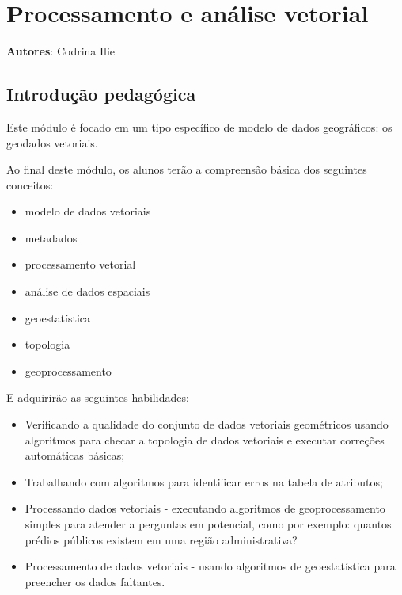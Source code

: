 \documentclass[
]{book}
\providecommand{\tightlist}{%
  \setlength{\itemsep}{0pt}\setlength{\parskip}{0pt}}
\begin{document}
\hypertarget{processamento-e-anuxe1lise-vetorial}{%
\chapter{\texorpdfstring{\textbf{Processamento e análise vetorial}}{Processamento e análise vetorial}}\label{processamento-e-anuxe1lise-vetorial}}

\textbf{Autores}: Codrina Ilie

\hypertarget{introduuxe7uxe3o-pedaguxf3gica-8}{%
\section{Introdução pedagógica}\label{introduuxe7uxe3o-pedaguxf3gica-8}}

Este módulo é focado em um tipo específico de modelo de dados geográficos: os geodados vetoriais.

Ao final deste módulo, os alunos terão a compreensão básica dos seguintes conceitos:

\begin{itemize}
\tightlist
\item
  modelo de dados vetoriais
\item
  metadados
\item
  processamento vetorial
\item
  análise de dados espaciais
\item
  geoestatística
\item
  topologia
\item
  geoprocessamento
\end{itemize}

E adquirirão as seguintes habilidades:

\begin{itemize}
\tightlist
\item
  Verificando a qualidade do conjunto de dados vetoriais geométricos usando algoritmos para checar a topologia de dados vetoriais e executar correções automáticas básicas;
\item
  Trabalhando com algoritmos para identificar erros na tabela de atributos;
\item
  Processando dados vetoriais - executando algoritmos de geoprocessamento simples para atender a perguntas em potencial, como por exemplo: quantos prédios públicos existem em uma região administrativa?
\item
  Processamento de dados vetoriais - usando algoritmos de geoestatística para preencher os dados faltantes.
\end{itemize}
\end{document}
